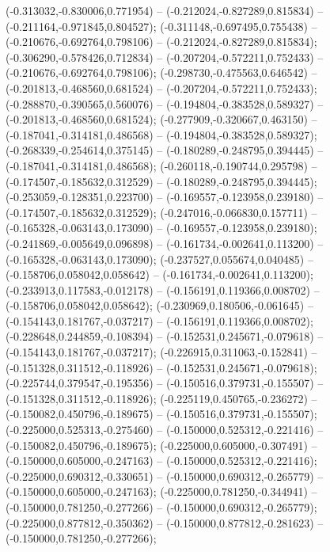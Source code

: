  (-0.313032,-0.830006,0.771954) -- (-0.212024,-0.827289,0.815834) -- (-0.211164,-0.971845,0.804527);
 (-0.311148,-0.697495,0.755438) -- (-0.210676,-0.692764,0.798106) -- (-0.212024,-0.827289,0.815834);
 (-0.306290,-0.578426,0.712834) -- (-0.207204,-0.572211,0.752433) -- (-0.210676,-0.692764,0.798106);
 (-0.298730,-0.475563,0.646542) -- (-0.201813,-0.468560,0.681524) -- (-0.207204,-0.572211,0.752433);
 (-0.288870,-0.390565,0.560076) -- (-0.194804,-0.383528,0.589327) -- (-0.201813,-0.468560,0.681524);
 (-0.277909,-0.320667,0.463150) -- (-0.187041,-0.314181,0.486568) -- (-0.194804,-0.383528,0.589327);
 (-0.268339,-0.254614,0.375145) -- (-0.180289,-0.248795,0.394445) -- (-0.187041,-0.314181,0.486568);
 (-0.260118,-0.190744,0.295798) -- (-0.174507,-0.185632,0.312529) -- (-0.180289,-0.248795,0.394445);
 (-0.253059,-0.128351,0.223700) -- (-0.169557,-0.123958,0.239180) -- (-0.174507,-0.185632,0.312529);
 (-0.247016,-0.066830,0.157711) -- (-0.165328,-0.063143,0.173090) -- (-0.169557,-0.123958,0.239180);
 (-0.241869,-0.005649,0.096898) -- (-0.161734,-0.002641,0.113200) -- (-0.165328,-0.063143,0.173090);
 (-0.237527,0.055674,0.040485) -- (-0.158706,0.058042,0.058642) -- (-0.161734,-0.002641,0.113200);
 (-0.233913,0.117583,-0.012178) -- (-0.156191,0.119366,0.008702) -- (-0.158706,0.058042,0.058642);
 (-0.230969,0.180506,-0.061645) -- (-0.154143,0.181767,-0.037217) -- (-0.156191,0.119366,0.008702);
 (-0.228648,0.244859,-0.108394) -- (-0.152531,0.245671,-0.079618) -- (-0.154143,0.181767,-0.037217);
 (-0.226915,0.311063,-0.152841) -- (-0.151328,0.311512,-0.118926) -- (-0.152531,0.245671,-0.079618);
 (-0.225744,0.379547,-0.195356) -- (-0.150516,0.379731,-0.155507) -- (-0.151328,0.311512,-0.118926);
 (-0.225119,0.450765,-0.236272) -- (-0.150082,0.450796,-0.189675) -- (-0.150516,0.379731,-0.155507);
 (-0.225000,0.525313,-0.275460) -- (-0.150000,0.525312,-0.221416) -- (-0.150082,0.450796,-0.189675);
 (-0.225000,0.605000,-0.307491) -- (-0.150000,0.605000,-0.247163) -- (-0.150000,0.525312,-0.221416);
 (-0.225000,0.690312,-0.330651) -- (-0.150000,0.690312,-0.265779) -- (-0.150000,0.605000,-0.247163);
 (-0.225000,0.781250,-0.344941) -- (-0.150000,0.781250,-0.277266) -- (-0.150000,0.690312,-0.265779);
 (-0.225000,0.877812,-0.350362) -- (-0.150000,0.877812,-0.281623) -- (-0.150000,0.781250,-0.277266);
